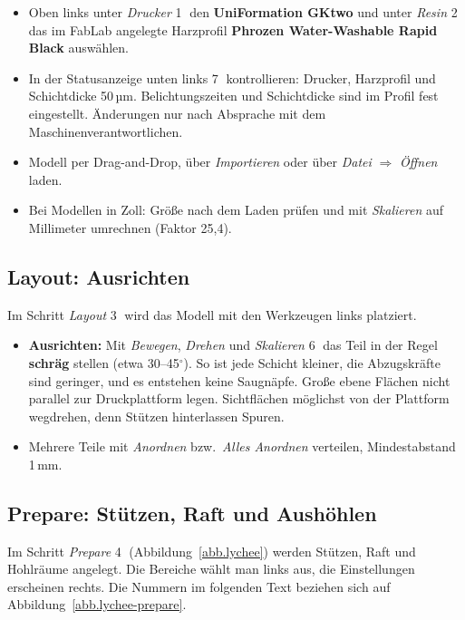\documentclass{\basedir/fablab-document}
\newcommand{\ra}{$\Rightarrow$}
\begin{document}
\begin{itemize}
	\item Oben links unter \textit{Drucker} \textcircled{\small 1} den \textbf{UniFormation GKtwo} und unter \textit{Resin} \textcircled{\small 2} das im FabLab angelegte Harzprofil \textbf{Phrozen Water-Washable Rapid Black} auswählen.
	\item In der Statusanzeige unten links \textcircled{\small 7} kontrollieren: Drucker, Harzprofil und Schichtdicke 50\,µm. Belichtungszeiten und Schichtdicke sind im Profil fest eingestellt. Änderungen nur nach Absprache mit dem Maschinenverantwortlichen.
	\item Modell per Drag-and-Drop, über \textit{Importieren} oder über \textit{Datei} \ra{} \textit{Öffnen} laden.
	\item Bei Modellen in Zoll: Größe nach dem Laden prüfen und mit \textit{Skalieren} auf Millimeter umrechnen (Faktor 25,4).
\end{itemize}

\subsection{Layout: Ausrichten}

Im Schritt \textit{Layout} \textcircled{\small 3} wird das Modell mit den Werkzeugen links platziert.

\begin{itemize}
	\item \textbf{Ausrichten:} Mit \textit{Bewegen}, \textit{Drehen} und \textit{Skalieren} \textcircled{\small 6} das Teil in der Regel \textbf{schräg} stellen (etwa 30--45$^\circ$). So ist jede Schicht kleiner, die Abzugskräfte sind geringer, und es entstehen keine Saugnäpfe. Große ebene Flächen nicht parallel zur Druckplattform legen. Sichtflächen möglichst von der Plattform wegdrehen, denn Stützen hinterlassen Spuren.
	\item Mehrere Teile mit \textit{Anordnen} bzw.\ \textit{Alles Anordnen} verteilen, Mindestabstand 1\,mm.
\end{itemize}

\subsection{Prepare: Stützen, Raft und Aushöhlen}

Im Schritt \textit{Prepare} \textcircled{\small 4} (Abbildung~\ref{abb.lychee}) werden Stützen, Raft und Hohlräume angelegt. Die Bereiche wählt man links aus, die Einstellungen erscheinen rechts. Die Nummern im folgenden Text beziehen sich auf Abbildung~\ref{abb.lychee-prepare}.
\end{document}
